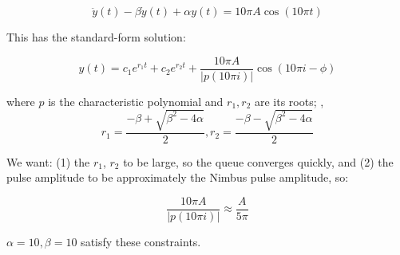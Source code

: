 \begin{Appendix}
\begin{equation}
    \ddot{y}(t) - \beta \dot{y}(t) + \alpha y(t) = 10\pi{}A \cos(10\pi{}t)
\end{equation}

    \noindent This has the standard-form solution:

\begin{equation}
    y(t) = c_1 e^{r_1 t} + c_2 e^{r_2 t} + \frac{10\pi{}A}{|p(10\pi{}i)|} \cos(10\pi{}i - \phi)
\end{equation}
        
where $p$ is the characteristic polynomial and $r_1, r_2$ are its roots;
\ie, 
\begin{equation}
r_1 = \frac{-\beta + \sqrt{\beta^2 - 4\alpha}}{2}, r_2 = \frac{-\beta - \sqrt{\beta^2 - 4\alpha}}{2}
\end{equation}

\noindent We want: (1) the $r_1$, $r_2$ to be large, so the queue converges quickly, and (2) the pulse amplitude to be approximately the Nimbus pulse amplitude, so:

\begin{equation}
\frac{10\pi{}A}{|p(10\pi{}i)|} \approx \frac{A}{5\pi}
\end{equation}

$\alpha = 10, \beta = 10$ satisfy these constraints.
\end{Appendix}

